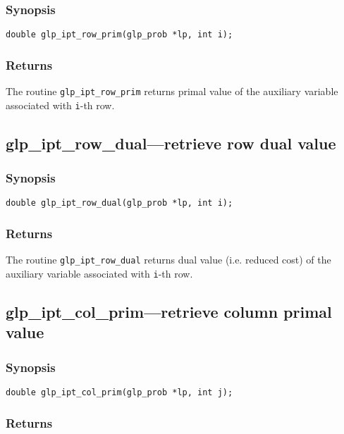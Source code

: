 \subsubsection*{Synopsis}

\begin{verbatim}
double glp_ipt_row_prim(glp_prob *lp, int i);
\end{verbatim}

\subsubsection*{Returns}

The routine \verb|glp_ipt_row_prim| returns primal value of the
auxiliary variable associated with \verb|i|-th row.

\subsection{glp\_ipt\_row\_dual---retrieve row dual value}

\subsubsection*{Synopsis}

\begin{verbatim}
double glp_ipt_row_dual(glp_prob *lp, int i);
\end{verbatim}

\subsubsection*{Returns}

The routine \verb|glp_ipt_row_dual| returns dual value (i.e. reduced
cost) of the auxiliary variable associated with \verb|i|-th row.

\subsection{glp\_ipt\_col\_prim---retrieve column primal value}

\subsubsection*{Synopsis}

\begin{verbatim}
double glp_ipt_col_prim(glp_prob *lp, int j);
\end{verbatim}

\subsubsection*{Returns}

